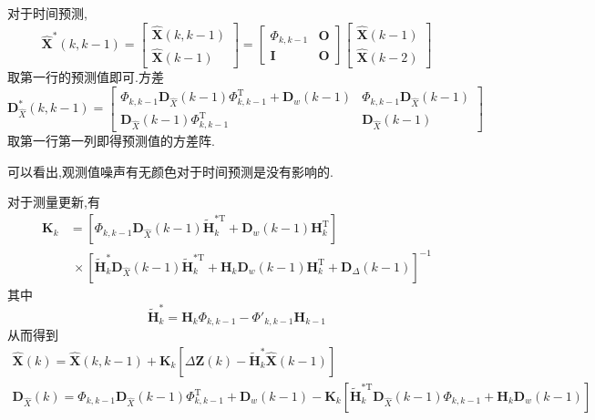 \documentclass[cn,10pt,citestyle=gb7714-2015,bibstyle=gb7714-2015]{elegantbook}
\newcommand{\mT}{\mathrm{T}}
\begin{document}
对于时间预测,
\begin{equation}
  \hat{\bm{X}}^*(k,k-1)=\begin{bmatrix}
    \hat{\bm{X}}(k,k-1)\\
    \hat{\bm{X}}(k-1)
  \end{bmatrix}=\begin{bmatrix}
    \bm{\varPhi}_{k,k-1}&\bm{O}\\
    \bm{I}&\bm{O}
  \end{bmatrix}\begin{bmatrix}
    \hat{\bm{X}}(k-1)\\
    \hat{\bm{X}}(k-2)
  \end{bmatrix}
\end{equation}
取第一行的预测值即可.方差
\begin{equation}
  \bm{D}^*_{\hat{X}}(k,k-1)=\begin{bmatrix}
    \bm{\varPhi}_{k,k-1}\bm{D}_{\hat{X}}(k-1)\bm{\varPhi}_{k,k-1}^\mT+\bm{D}_w(k-1)&\bm{\varPhi}_{k,k-1}\bm{D}_{\hat{X}}(k-1)\\
    \bm{D}_{\hat{X}}(k-1)\bm{\varPhi}_{k,k-1}^\mT&\bm{D}_{\hat{X}}(k-1)
  \end{bmatrix}
\end{equation}
取第一行第一列即得预测值的方差阵.

可以看出,观测值噪声有无颜色对于时间预测是没有影响的.

对于测量更新,有
\begin{align*}
  \bm{K}_k&=\left[\bm{\varPhi}_{k,k-1}\bm{D}_{\hat{X}}(k-1)\widetilde{\bm{H}}_k^{*\mT}+\bm{D}_w(k-1)\bm{H}_k^\mT\right]\\
  &\ \times\left[\widetilde{\bm{H}}_k^{*}\bm{D}_{\hat{X}}(k-1)\widetilde{\bm{H}}_k^{*\mT}+\bm{H}_k\bm{D}_w(k-1)\bm{H}_k^\mT+\bm{D}_\varDelta(k-1)\right]^{-1}
\end{align*}
其中
\begin{equation}
  \widetilde{\bm{H}}_k^*=\bm{H}_k\bm{\varPhi}_{k,k-1}-\bm{\varPhi}'_{k,k-1}\bm{H}_{k-1}
\end{equation}
从而得到
\begin{gather}
  \hat{\bm{X}}(k)=\hat{\bm{X}}(k,k-1)+\bm{K}_k\left[\Delta\bm{Z}(k)-\widetilde{\bm{H}}_k^*\hat{\bm{X}}(k-1)\right]\\
  \bm{D}_{\hat{X}}(k)=\bm{\varPhi}_{k,k-1}\bm{D}_{\hat{X}}(k-1)\bm{\varPhi}_{k,k-1}^\mT+\bm{D}_w(k-1)-\bm{K}_k\left[\widetilde{\bm{H}}_k^{*\mT}\bm{D}_{\hat{X}}(k-1)\bm{\varPhi}_{k,k-1}+\bm{H}_k\bm{D}_w(k-1)\right]
\end{gather}
\end{document}

